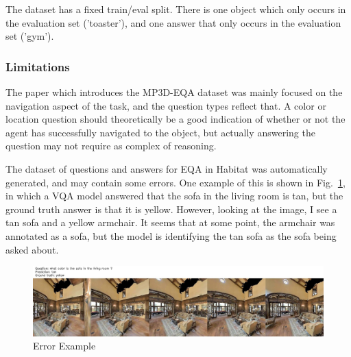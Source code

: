 The dataset has a fixed train/eval split. There is one object which only occurs in the evaluation set ('toaster'), and one answer that only occurs in the evaluation set ('gym'). 

\subsubsection{Limitations}
The paper which introduces the MP3D-EQA dataset was mainly focused on the navigation aspect of the task, and the question types reflect that. A color or location question should theoretically be a good indication of whether or not the agent has successfully navigated to the object, but actually answering the question may not require as complex of reasoning. 

The dataset of questions and answers for EQA in Habitat was automatically generated, and may contain some errors. One example of this is shown in Fig.~\ref{fig:err_ex}, in which a VQA model answered that the sofa in the living room is tan, but the ground truth answer is that it is yellow. However, looking at the image, I see a tan sofa and a yellow armchair. It seems that at some point, the armchair was annotated as a sofa, but the model is identifying the tan sofa as the sofa being asked about. 

\begin{figure}[h]
	\centering
	\includegraphics[width=\textwidth]{./figure/error_images/ckpt_0_121_image.jpg}
	\caption{Error Example}
	\label{fig:err_ex}
\end{figure}




